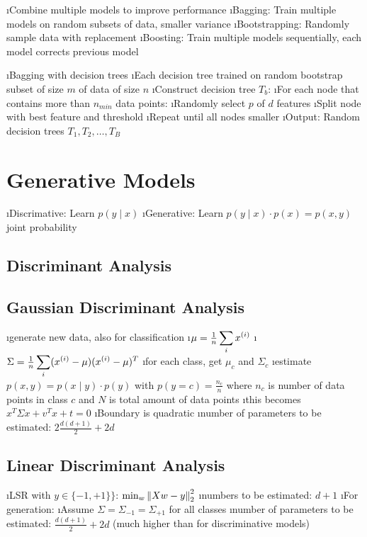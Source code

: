\bi
\i Combine multiple models to improve performance
\i Bagging: Train multiple models on random subsets of data, smaller variance
\i Bootstrapping: Randomly sample data with replacement
\i Boosting: Train multiple models sequentially, each model corrects previous model
\ei


\bi
\i Bagging with decision trees
\i Each decision tree trained on random bootstrap subset of size $m$ of data of size $n$
\i Construct decision tree $T_b$:
\bi
\i For each node that contains more than $n_{min}$ data points:
\i Randomly select $p$ of $d$ features
\i Split node with best feature and threshold
\i Repeat until all nodes smaller
\ei
\i Output: Random decision trees $T_1, T_2, \ldots, T_B$
\ei

\section{Generative Models}

\bi
\i Discrimative: Learn $p(y \mid x)$
\i Generative: Learn $p(y \mid x) \cdot p(x) = p(x, y)$ joint probability
\ei

\subsection{Discriminant Analysis}

\subsection{Gaussian Discriminant Analysis}

\bi
\i generate new data, also for classification
\i $\mu = \frac{1}{n} \displaystyle\sum_i x^{(i)}$
\i $\Sigma = \frac{1}{n} \displaystyle\sum_i (x^{(i)} - \mu) (x^{(i)} - \mu)^T$
\i for each class, get $\mu_c$ and $\Sigma_c$
\i estimate $p(x,y) = p(x \mid y) \cdot p(y)$ with $p(y=c) = \frac{n_c}{n}$ where $n_c$ is number of data points in class $c$ and $N$ is total amount of data points
\i this becomes $x^T \Sigma x + v^Tx + t=0$
\i Boundary is quadratic
\i number of parameters to be estimated: $2 \frac{d(d+1)}{2} + 2d$
\ei

\subsection{Linear Discriminant Analysis}

\bi
\i LSR with $y \in \{-1, +1\}\}$: $\min_w \left\lVert Xw-y\right\rVert_2^2$
\i numbers to be estimated: $d+1$
\i For generation:
\bi
\i Assume $\Sigma = \Sigma_{-1} = \Sigma_{+1}$ for all classes
\i number of parameters to be estimated: $\frac{d(d+1)}{2} + 2d$ (much higher than for discriminative models)
\ei
\ei

